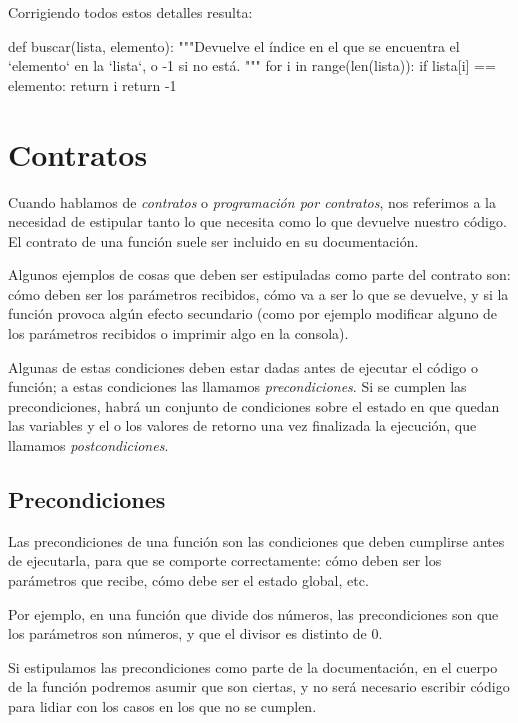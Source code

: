 Corrigiendo todos estos detalles resulta:

\begin{codigo-python-sn}
def buscar(lista, elemento):
    """Devuelve el índice en el que se encuentra el `elemento` en la `lista`,
       o -1 si no está.
    """
    for i in range(len(lista)):
        if lista[i] == elemento:
            return i
    return -1
\end{codigo-python-sn}

\section{Contratos}

Cuando hablamos de \textit{contratos} o \textit{programación por
contratos}, nos referimos a la necesidad de estipular tanto lo que necesita
como lo que devuelve nuestro código. El contrato de una función suele ser
incluido en su documentación.

Algunos ejemplos de cosas que deben ser estipuladas como parte del contrato
son: cómo deben ser los parámetros recibidos, cómo va a ser lo que se devuelve,
y si la función provoca algún efecto secundario (como por ejemplo modificar
alguno de los parámetros recibidos o imprimir algo en la consola).

Algunas de estas condiciones deben estar dadas antes de ejecutar el código o
función; a estas condiciones las llamamos \emph{precondiciones}. Si se cumplen
las precondiciones, habrá un conjunto de condiciones sobre el estado en que
quedan las variables y el o los valores de retorno una vez finalizada la
ejecución, que llamamos \emph{postcondiciones}.

\subsection{Precondiciones}

Las precondiciones de una función son las condiciones que deben cumplirse antes
de ejecutarla, para que se comporte correctamente: cómo deben ser los
parámetros que recibe, cómo debe ser el estado global, etc.

Por ejemplo, en una función que divide dos números, las precondiciones son que los parámetros
son números, y que el divisor es distinto de 0.

Si estipulamos las precondiciones como parte de la documentación, en el cuerpo
de la función podremos asumir que son ciertas, y no será necesario escribir
código para lidiar con los casos en los que no se cumplen.

